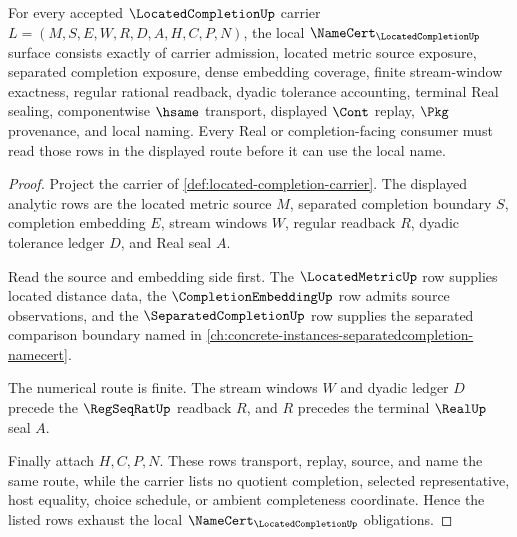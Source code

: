 \begin{theorem}
\label{thm:located-completion-namecert-obligations}
For every accepted $\LocatedCompletionUp$ carrier $L=(M,S,E,W,R,D,A,H,C,P,N)$, the local $\NameCert_{\LocatedCompletionUp}$ surface consists exactly of carrier admission, located metric source exposure, separated completion exposure, dense embedding coverage, finite stream-window exactness, regular rational readback, dyadic tolerance accounting, terminal Real sealing, componentwise $\hsame$ transport, displayed $\Cont$ replay, $\Pkg$ provenance, and local naming. Every Real or completion-facing consumer must read those rows in the displayed route before it can use the local name.
\end{theorem}
\begin{proof}
Project the carrier of \autoref{def:located-completion-carrier}. The displayed analytic rows are the located metric source $M$, separated completion boundary $S$, completion embedding $E$, stream windows $W$, regular readback $R$, dyadic tolerance ledger $D$, and Real seal $A$.

Read the source and embedding side first. The $\LocatedMetricUp$ row supplies located distance data, the $\CompletionEmbeddingUp$ row admits source observations, and the $\SeparatedCompletionUp$ row supplies the separated comparison boundary named in \autoref{ch:concrete-instances-separatedcompletion-namecert}.

The numerical route is finite. The stream windows $W$ and dyadic ledger $D$ precede the $\RegSeqRatUp$ readback $R$, and $R$ precedes the terminal $\RealUp$ seal $A$.

Finally attach $H,C,P,N$. These rows transport, replay, source, and name the same route, while the carrier lists no quotient completion, selected representative, host equality, choice schedule, or ambient completeness coordinate. Hence the listed rows exhaust the local $\NameCert_{\LocatedCompletionUp}$ obligations.
\end{proof}

